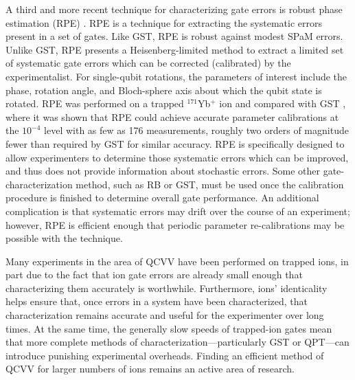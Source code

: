 \documentclass[%
12pt,
 amsmath,amssymb,
]{revtex4-2}
\begin{document}
A third and more recent technique for characterizing gate errors is robust phase estimation (RPE) \cite{kimmel2015robust}. RPE is a technique for extracting the systematic errors present in a set of gates. Like GST, RPE is robust against modest SPaM errors. Unlike GST, RPE presents a Heisenberg-limited method to extract a limited set of systematic gate errors which can be corrected (calibrated) by the experimentalist. For single-qubit rotations, the parameters of interest include the phase, rotation angle, and Bloch-sphere axis about which the qubit state is rotated. RPE was performed on a trapped $^{171}$Yb$^+$ ion and compared with GST \cite{rudinger2017experimental}, where it was shown that RPE could achieve accurate parameter calibrations at the $10^{-4}$ level with as few as 176 measurements, roughly two orders of magnitude fewer than required by GST for similar accuracy. RPE is specifically designed to allow experimenters to determine those systematic errors which can be improved, and thus does not provide information about stochastic errors. Some other gate-characterization method, such as RB or GST, must be used once the calibration procedure is finished to determine overall gate performance. An additional complication is that systematic errors may drift over the course of an experiment; however, RPE is efficient enough that periodic parameter re-calibrations may be possible with the technique.

Many experiments in the area of QCVV have been performed on trapped ions, in part due to the fact that ion gate errors are already small enough that characterizing them accurately is worthwhile. Furthermore, ions' identicality helps ensure that, once errors in a system have been characterized, that characterization remains accurate and useful for the experimenter over long times. At the same time, the generally slow speeds of trapped-ion gates mean that more complete methods of characterization---particularly GST or QPT---can introduce punishing experimental overheads. Finding an efficient method of QCVV for larger numbers of ions remains an active area of research.
\end{document}
